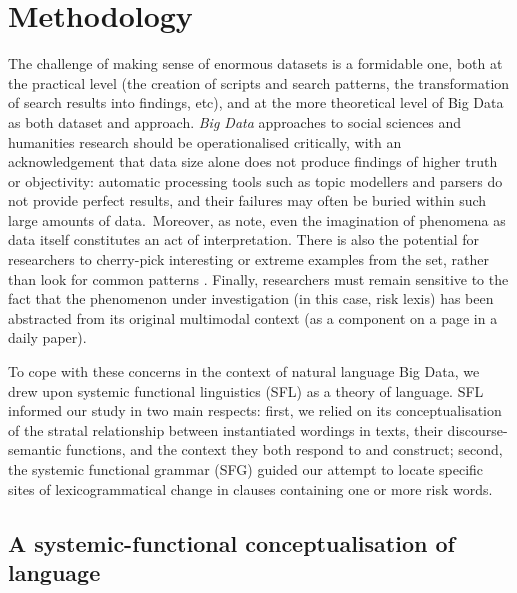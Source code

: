 
\chapter{Methodology}
	
	The challenge of making sense of enormous datasets is a formidable one, both at the practical level (the creation of scripts and search patterns, the transformation of search results into findings, etc), and at the more theoretical level of Big Data as both dataset and approach. \emph{Big Data} approaches to social sciences and humanities research should be operationalised critically, with an acknowledgement that data size alone does not produce findings of higher truth or objectivity: automatic processing tools such as topic modellers and parsers do not provide perfect results, and their failures may often be buried within such large amounts of data.~Moreover, as  note, even the imagination of phenomena as data itself constitutes an act of interpretation. There is also the potential for researchers to cherry-pick interesting or extreme examples from the set, rather than look for common patterns \cite{mautner_time_2005}. Finally, researchers must remain sensitive to the fact that the phenomenon under investigation (in this case, risk lexis) has been abstracted from its original multimodal context (as a component on a page in a daily paper).

	To cope with these concerns in the context of natural language Big Data, we drew upon systemic functional linguistics (SFL) as a theory of language. SFL informed our study in two main respects: first, we relied on its conceptualisation of the stratal relationship between instantiated wordings in texts, their discourse-semantic functions, and the context they both respond to and construct; second, the systemic functional grammar (SFG) guided our attempt to locate specific sites of lexicogrammatical change in clauses containing one or more risk words.

	\section{A systemic-functional conceptualisation of language}

